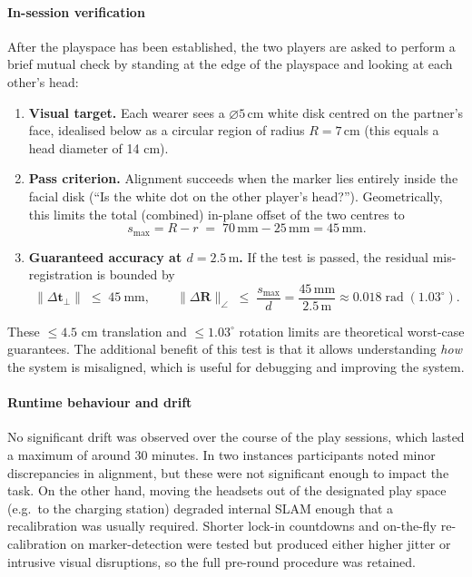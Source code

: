 \paragraph{In-session verification}
After the playspace has been established, the two players are asked to perform a brief mutual check by standing at the edge of the playspace and looking at each other's head:
    \begin{enumerate}
    \item \textbf{Visual target.}\;
          Each wearer sees a $\varnothing5\,\mathrm{cm}$ white disk centred on the partner's face, idealised below as a circular region of radius $R=7\,\mathrm{cm}$ (this equals a head diameter of 14 cm).
    
    \item \textbf{Pass criterion.}\;
          Alignment succeeds when the marker lies entirely inside the facial disk (“Is the white dot on the other player's head?”). Geometrically, this limits the total (combined) in-plane offset of the two centres to
          \[
            s_{\max}=R-r\;=\;70\,\mathrm{mm}-25\,\mathrm{mm}=45\,\mathrm{mm}.
            \tag{1}\label{eq:smax}
          \]
    
    \item \textbf{Guaranteed accuracy at $d=2.5\,\mathrm m$.}
          If the test is passed, the residual mis-registration is bounded by
          \[
            \boxed{\|\Delta\mathbf t_{\perp}\|\;\le\;45~\text{mm}},
            \qquad
            \boxed{\|\Delta\mathbf R\|_{\angle}\;\le\;
                   \frac{s_{\max}}{d}= \frac{45\,\mathrm{mm}}{2.5\,\mathrm{m}}
                   \approx 0.018\;\text{rad}\;(1.03^{\circ}) }.
            \tag{2}\label{eq:bounds}
          \]
    \end{enumerate}
    
    These $\le\!4.5\text{ cm}$ translation and $\le\!1.03^{\circ}$ rotation limits are theoretical worst-case guarantees. The additional benefit of this test is that it allows understanding \emph{how} the system is misaligned, which is useful for debugging and improving the system.

\paragraph{Runtime behaviour and drift}
No significant drift was observed over the course of the play sessions, which lasted a maximum of around 30 minutes. In two instances participants noted minor discrepancies in alignment, but these were not significant enough to impact the task. On the other hand, moving the headsets out of the designated play space (e.g.\ to the charging station) degraded internal SLAM enough that a recalibration was usually required.
Shorter lock-in countdowns and on-the-fly re-calibration on marker-detection were tested but produced either higher jitter or intrusive visual disruptions, so the full pre-round procedure was retained.

